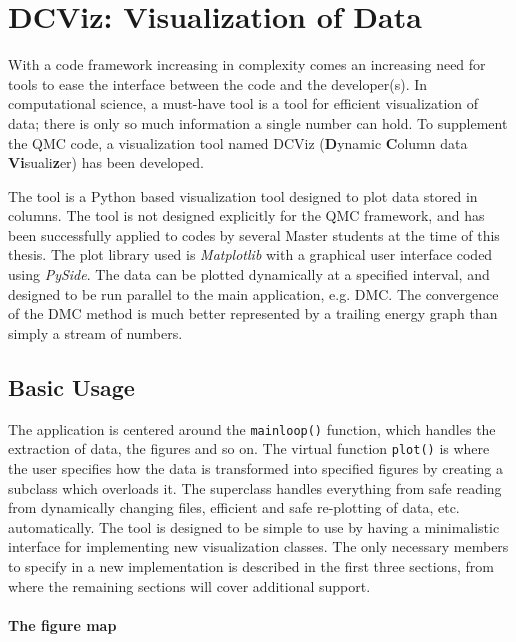 \chapter{DCViz: Visualization of Data}

With a code framework increasing in complexity comes an increasing need for tools to ease the interface between the code and the developer(s). In computational science, a must-have tool is a tool for efficient visualization of data; there is only so much information a single number can hold. To supplement the QMC code, a visualization tool named DCViz (\textbf{D}ynamic \textbf{C}olumn data \textbf{Vi}suali\textbf{z}er) has been developed.

The tool is a Python based visualization tool designed to plot data stored in columns. The tool is not designed explicitly for the QMC framework, and has been successfully applied to codes by several Master students at the time of this thesis. The plot library used is \textit{Matplotlib}\cite{Matplotlib} with a graphical user interface coded using \textit{PySide}\cite{Pyside}. The data can be plotted dynamically at a specified interval, and designed to be run parallel to the main application, e.g. DMC. The convergence of the DMC method is much better represented by a trailing energy graph than simply a stream of numbers.

\section{Basic Usage}

The application is centered around the \verb+mainloop()+ function, which handles the extraction of data, the figures and so on. The virtual function \verb+plot()+ is where the user specifies how the data is transformed into specified figures by creating a subclass which overloads it. The superclass handles everything from safe reading from dynamically changing files, efficient and safe re-plotting of data, etc. automatically. The tool is designed to be simple to use by having a minimalistic interface for implementing new visualization classes. The only necessary members to specify in a new implementation is described in the first three sections, from where the remaining sections will cover additional support. 

\subsubsection{The figure map}

